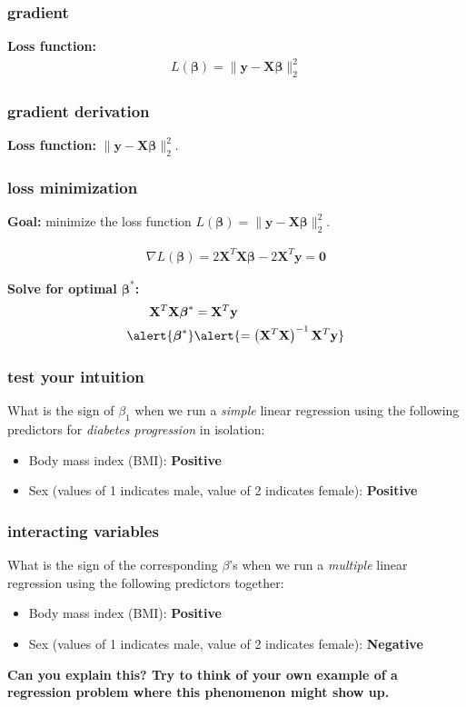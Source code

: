 \documentclass[handout,compress]{beamer}
\newcommand{\bs}[1]{\boldsymbol{#1}}
\newcommand{\bv}[1]{\mathbf{#1}}
\begin{document}
\begin{frame}[t]
	\frametitle{gradient}
	\textbf{Loss function:}
	\begin{align*}
	L(\bs{\beta}) = \|\bv{y} - \bv{X}\bs{\beta}\|_2^2
	\end{align*}
	
\end{frame}




\begin{frame}[t]
	\frametitle{gradient derivation}
	\begin{center}
	\textbf{Loss function:} $\|\bv{y} - \bv{X}\bs{\beta}\|_2^2$. 
	\end{center}
	
\end{frame}

\begin{frame}[t]
		\frametitle{loss minimization}
	\textbf{Goal:} minimize the loss function $L(\bs{\beta}) = \|\bv{y} - \bv{X}\bs{\beta}\|_2^2$.
	
	\begin{align*}
	\nabla L(\bs{\beta}) = 2\bv{X}^T\bv{X}\bs{\beta} - 2\bv{X}^T\bv{y} = \bv{0}
	\end{align*}
	
	\textbf{Solve for optimal $\bs{\beta}^*$:}
	\begin{align*}
	\bv{X}^T\bv{X}\bs{\beta}^* &= \bv{X}^T\bv{y} \\
	\alert{\bs{\beta}^*} &\alert{= \left(\bv{X}^T\bv{X}\right)^{-1}\bv{X}^T\bv{y}}
	\end{align*}
\end{frame}

\begin{frame}
	\frametitle{test your intuition}
	What is the sign of $\beta_1$ when we run a \emph{simple} linear regression using the following predictors for \emph{diabetes progression} in isolation:
	\begin{itemize}
		\item Body mass index (BMI): \textbf{Positive}
		\item Sex (values of 1 indicates male, value of 2 indicates female): \textbf{Positive}
	\end{itemize}
\end{frame}

\begin{frame}
	\frametitle{interacting variables}
	What is the sign of the corresponding $\beta$'s when we run a \emph{multiple} linear regression using the following predictors together:
\begin{itemize}
	\item Body mass index (BMI): \textbf{Positive}
	\item Sex (values of 1 indicates male, value of 2 indicates female): \textbf{Negative}
\end{itemize}
\begin{center}
	\alert{\textbf{Can you explain this? Try to think of your own example of a regression problem where this phenomenon might show up.}}
\end{center}
\end{frame}
\end{document}
